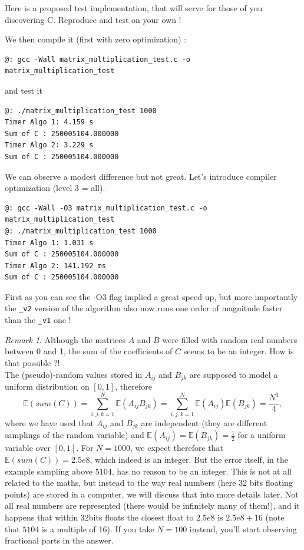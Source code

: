 \documentclass[12pt]{article}
\theoremstyle{plain}
\theoremstyle{remark}
\newtheorem*{remark}{Remark}
\newcommand{\boE}{\mathbb{E}}
\begin{document}
\medskip

Here is a proposed test implementation, that will serve for those of you
discovering C. Reproduce and test on your own !



We then compile it (first with zero optimization) :

\begin{lstlisting}[style=bash]
@: gcc -Wall matrix_multiplication_test.c -o matrix_multiplication_test
\end{lstlisting}

and test it

\begin{lstlisting}[style=bash]
@: ./matrix_multiplication_test 1000
Timer Algo 1: 4.159 s
Sum of C : 250005104.000000
Timer Algo 2: 3.229 s
Sum of C : 250005104.000000
\end{lstlisting}

We can observe a modest difference but not great. Let's introduce compiler
optimization (level 3 = all).

\begin{lstlisting}[style=bash]
@: gcc -Wall -O3 matrix_multiplication_test.c -o matrix_multiplication_test
@: ./matrix_multiplication_test 1000
Timer Algo 1: 1.031 s
Sum of C : 250005104.000000
Timer Algo 2: 141.192 ms
Sum of C : 250005104.000000
\end{lstlisting}

First as you can see the -O3 flag implied a great speed-up, but more importantly 
the {\tt\_v2} version of the algorithm also now runs one order of magnitude faster than 
the {\tt\_v1} one !

\medskip

\begin{remark} Although the matrices $A$ and $B$ 
were filled with random real numbers between 0 and 1, the sum of 
the coefficients of $C$ seems to be an integer. How is that possible ?!\\ 
The (pseudo)-random values stored in $A_{ij}$ and $B_{jk}$  are supposed
to model a uniform distribution on $[0,1]$, therefore
$$
\boE(sum(C)) = \sum_{i,j,k = 1}^N \boE(A_{ij}B_{jk}) =  \sum_{i,j,k = 1}^N
\boE(A_{ij}) \boE(B_{jk}) = \frac{N^3}{4},
$$
where we have used that $A_{ij}$ and $B_{jk}$ are independent (they are
different samplings of the random variable) and $\boE(A_{ij}) = \boE(B_{jk}) =
\frac{1}{2}$ for a uniform variable over $[0,1]$. For $N = 1000$, we expect therefore
that $\boE(sum(C)) = 2.5e8$, which indeed is an integer. But the error itself,
in the example sampling above $5104$, has no reason to be an integer. This is
not at all related to the maths, but instead to the way real numbers (here 32
bits floating points) are stored in a computer, we will discuss that into more
details later. 
Not all real numbers are represented (there would be infinitely
many of them!), and it happens that within 32bits floats the closest float to
	$2.5e8$ is $2.5e8 + 16$ (note that $5104$ is a multiple of 16). If you take $N = 100$ instead, you'll start
observing fractional parts in the answer.
\end{remark}
\end{document}
